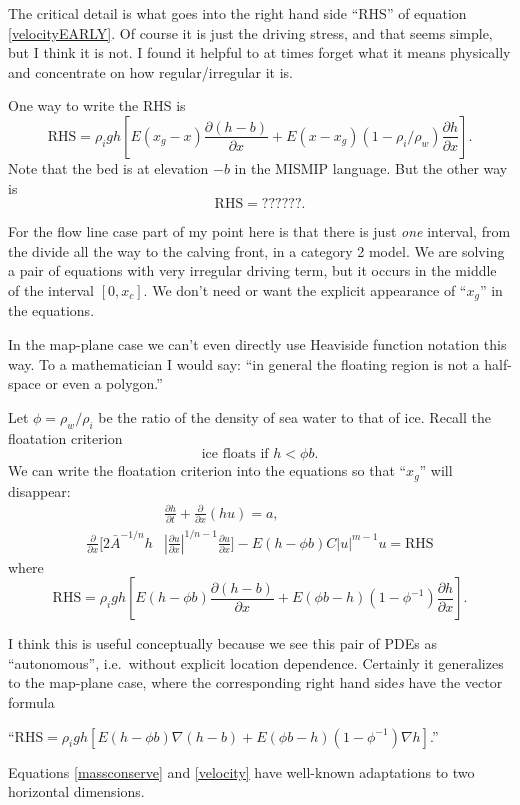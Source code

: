 \documentclass[11pt,final]{amsart}
\newcommand{\ddt}[1]{\ensuremath{\frac{\partial #1}{\partial t}}}
\newcommand{\ddx}[1]{\ensuremath{\frac{\partial #1}{\partial x}}}
\newcommand{\grad}{\nabla}
\begin{document}
The critical detail is what goes into the right hand side ``RHS'' of equation \eqref{velocityEARLY}.  Of course it is just the driving stress, and that seems simple, but I think it is not.  I found it helpful to at times forget what it means physically and concentrate on how regular/irregular it is.

One way to write the RHS is
\begin{equation}
\text{RHS} =  \rho_i g h \left[E(x_g-x) \ddx{(h-b)} + E(x-x_g) (1-\rho_i/\rho_w) \ddx{h}\right]. \label{RHSwxgONE}
\end{equation}
Note that the bed is at elevation $-b$ in the MISMIP language.  But the other way is
\begin{equation}
\text{RHS} =  ??????. \label{RHSwxgTWO}
\end{equation}

For the flow line case part of my point here is that there is just \emph{one} interval, from the divide all the way to the calving front, in a category 2 model.  We are solving a pair of equations with very irregular driving term, but it occurs in the middle of the interval $[0,x_c]$.  We don't need or want the explicit appearance of ``$x_g$'' in the equations.

In the map-plane case we can't even directly use Heaviside function notation this way.  To a mathematician I would say: ``in general the floating region is not a half-space or even a polygon.''

Let $\phi = \rho_w/\rho_i$ be the ratio of the density of sea water to that of ice.  Recall the floatation criterion
	$$\text{ice floats if } h < \phi b.$$
We can write the floatation criterion into the equations so that ``$x_g$'' will disappear:
\begin{align}
&\ddt{h} + \ddx{}\left(h u\right) = a, \label{massconserve} \\
\ddx{}\Big[2 {\bar A}^{-1/n} h &\left|\ddx{u}\right|^{1/n-1} \ddx{u}\Big] - E(h - \phi b) C|u|^{m-1} u = \text{RHS} \label{velocity}
\end{align}
where
	$$\text{RHS} = \rho_i g h \left[E(h - \phi b) \ddx{(h-b)} + E(\phi b - h) (1-\phi^{-1}) \ddx{h}\right].$$

I think this is useful conceptually because we see this pair of PDEs as ``autonomous'', i.e.~without explicit location dependence.  Certainly it generalizes to the map-plane case, where the corresponding right hand side\emph{s} have the vector formula

	\centerline{``$\text{RHS} = \rho_i g h \left[E(h - \phi b) \grad(h-b) + E(\phi b - h) (1-\phi^{-1}) \grad h\right]$.''}
\noindent Equations \eqref{massconserve} and \eqref{velocity} have well-known adaptations to two horizontal dimensions.



\end{document}
